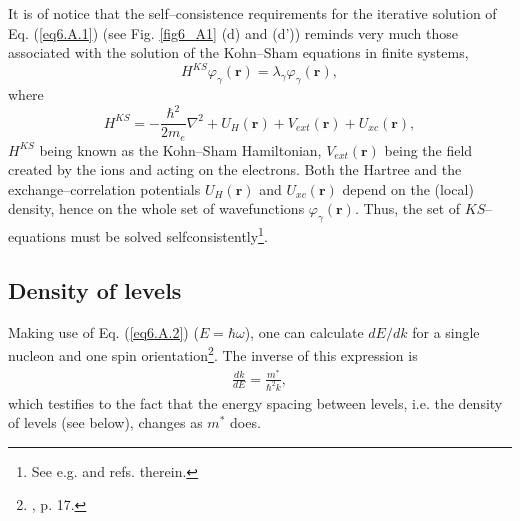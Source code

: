 It is of notice that the self--consistence requirements for the iterative solution of Eq. (\ref{eq6.A.1}) (see Fig. \ref{fig6_A1} (d) and (d')) reminds very much those associated with the solution of the Kohn--Sham equations in finite systems,
 \begin{equation}
 H^{KS}\varphi_\gamma(\mathbf{r})=\lambda_\gamma\varphi_\gamma(\mathbf{r}),
 \end{equation}
where
 \begin{equation}
 H^{KS}=-\frac{\hbar^2}{2 m_e}\nabla^2+U_H(\mathbf{r})+V_{ext}(\mathbf{r})+U_{xc}(\mathbf{r}),
 \end{equation}
$H^{KS}$ being known as the Kohn--Sham Hamiltonian, $V_{ext}(\mathbf{r})$ being the field created by the ions and acting on the electrons. Both the Hartree and the exchange--correlation potentials $U_H(\mathbf{r})$ and $U_{xc}(\mathbf{r})$ depend on the (local) density, hence on the whole set of wavefunctions $\varphi_\gamma(\mathbf{r})$. Thus, the set of $KS$--equations must be solved selfconsistently\footnote{See e.g. \cite{Broglia:04b} and refs. therein.}.
\subsection{Density of levels}\label{C4AppA1}
Making use of Eq. (\ref{eq6.A.2})  ($E=\hbar\omega$), one can calculate $dE/dk$ for a single nucleon and one spin orientation\footnote{\cite{Mahaux:85}, p. 17.}. The inverse of this expression is
\begin{align}
\frac{dk}{dE}=\frac{m^*}{\hbar^2k},
\end{align} 
which testifies to the fact that the energy spacing between levels, i.e. the density of levels (see below), changes as $m^*$ does.

